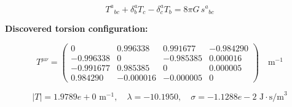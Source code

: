 
\begin{equation}
  T^a{}_{bc} + \delta^a_b T_c - \delta^a_c T_b = 8\pi G \, s^a{}_{bc}
\end{equation}

\textbf{Discovered torsion configuration:}

\begin{equation}
  T^{\mu\nu} = \begin{pmatrix}
    0 & 0.996338 & 0.991677 & -0.984290 \\
    -0.996338 & 0 & -0.985385 & 0.000016 \\
    -0.991677 & 0.985385 & 0 & 0.000005 \\
    0.984290 & -0.000016 & -0.000005 & 0
  \end{pmatrix} \quad \text{m}^{-1}
\end{equation}

\begin{equation}
  |T| = 1.9789e+0 \text{ m}^{-1}, \quad
  \lambda = -10.1950, \quad
  \sigma = -1.1288e-2 \text{ J}\cdot\text{s/m}^3
\end{equation}